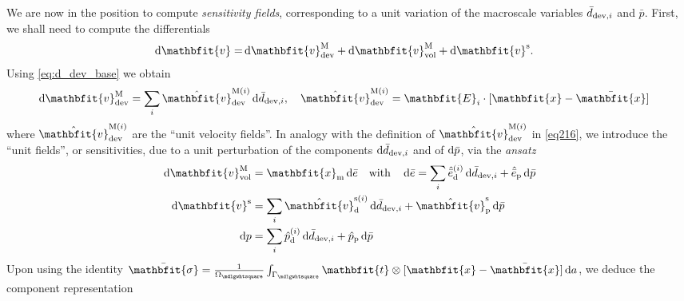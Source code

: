 \documentclass[12pt,review]{elsarticle}
\renewcommand{\ta}[1]{\mathbfit{#1}}
\renewcommand{\ts}[1]{\mathbfit{#1}}
\renewcommand{\Box}{\mdlgwhtsquare}
\newcommand{\ded}{\mathrm{d}}
\newcommand{\dep}{\mathrm{p}}
\begin{document}
We are now in the position to compute \emph{sensitivity fields}, corresponding to a unit variation of the macroscale variables $\bar{d}_{\mathrm{dev},i}$ and $\bar{p}$. First, we shall need to compute the differentials
\begin{align}
    \dif\ta{v}
     = &
    \dif\ta{v}^\macro_\dev + \dif\ta{v}^\macro_\vol + \dif\ta{v}^\fluct.
\label{eq:dv}
\end{align}
Using \eqref{eq:d_dev_base} we obtain
\begin{align}
  \dif \ta{v}^{\macro}_\dev &= \sum_{i} \hat{\ta{v}}^{\macro(i)}_\dev \dif\bar{d}_{\dev,i}, \quad  \hat{\ta{v}}^{\macro(i)}_\dev = \ts E_i \cdot [\ta x - \bar{\ta x}]
\label{eq216}
\end{align}
where $\hat{\ta{v}}^{\macro(i)}_\dev$ are the ``unit velocity fields''. In analogy with the definition of $\hat{\ta{v}}^{\macro(i)}_\dev$
in \eqref{eq216}, we introduce the ``unit fields'', or sensitivities, due to a unit perturbation of the components $\operatorname{d \!}\bar{d}_{\mathrm{dev},i}$ and of $\operatorname{d \!}\bar{p}$, via the \emph{ansatz}
\begin{align}
    \dif\ta{v}^\macro_\vol & = \ta x_\mean \dif \bar{e} \quad\mbox{with}\quad
    \dif\bar{e} = \sum_i \hat{\bar{e}}_{\ded}^{(i)}\dif\bar{d}_{\dev,i} + \hat{\bar{e}}_{\dep} \dif \bar{p}
\\
    \dif\ta v^\fluct &= \sum_i \hat{\ta{v}}_{\ded}^{\fluct(i)}\dif\bar{d}_{\dev,i} + \hat{\ta v}_{\dep}^\fluct \dif \bar{p}
\\
    \dif p  &= \sum_i \hat{p}^{(i)}_{\ded}\dif\bar{d}_{\dev,i} + \hat{p}_{\dep} \dif \bar{p}
\end{align}
Upon using the identity $\bar{\ts\sigma}=\frac{1}{\Omega_\Box} \int_{\Gamma_\Box} \ts t \outerp [\ta x - \bar{\ta x}]\dif a$, we deduce the component representation
\end{document}
